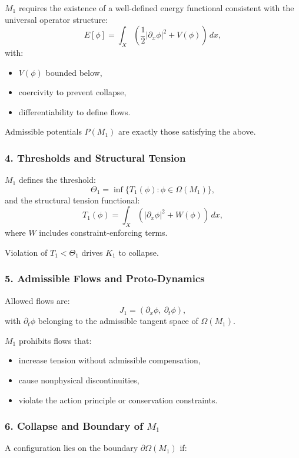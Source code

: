 $M_1$ requires the existence of a well-defined energy functional
consistent with the universal operator structure:
\[
E[\phi] = \int_X \left(
\frac{1}{2} |\partial_x \phi|^2 + V(\phi)
\right)\,dx,
\]
with:

\begin{itemize}
    \item $V(\phi)$ bounded below,
    \item coercivity to prevent collapse,
    \item differentiability to define flows.
\end{itemize}

Admissible potentials $P(M_1)$ are exactly those satisfying the above.

\subsubsection*{4. Thresholds and Structural Tension}

$M_1$ defines the threshold:
\[
\Theta_1 = \inf \{ T_1(\phi) : \phi \in \Omega(M_1) \},
\]
and the structural tension functional:
\[
T_1(\phi) = 
\int_X \left(
|\partial_x \phi|^2 + W(\phi)
\right)\, dx,
\]
where $W$ includes constraint-enforcing terms.

Violation of $T_1 < \Theta_1$ drives $K_1$ to collapse.

\subsubsection*{5. Admissible Flows and Proto-Dynamics}

Allowed flows are:
\[
J_1 = (\partial_x \phi,\ \partial_t \phi),
\]
with $\partial_t\phi$ belonging to the admissible tangent space of $\Omega(M_1)$.

$M_1$ prohibits flows that:
\begin{itemize}
    \item increase tension without admissible compensation,
    \item cause nonphysical discontinuities,
    \item violate the action principle or conservation constraints.
\end{itemize}

\subsubsection*{6. Collapse and Boundary of \texorpdfstring{$M_1$}{M_1}}

A configuration lies on the boundary $\partial\Omega(M_1)$ if:

